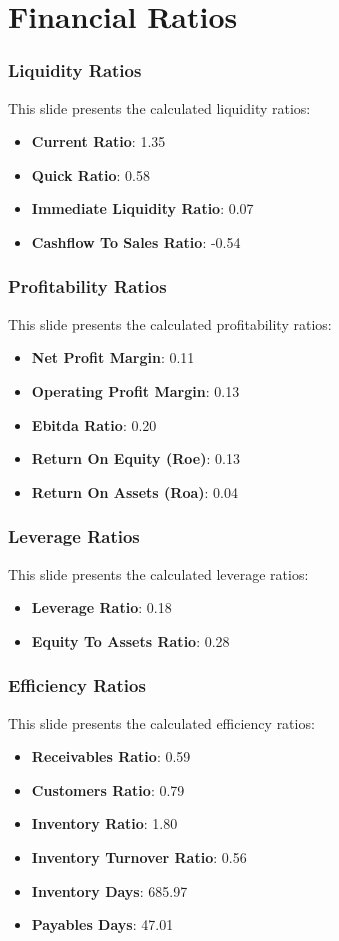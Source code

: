 \documentclass{beamer}%
\begin{document}
\section{Financial Ratios}%
\label{sec:FinancialRatios}%
\begin{frame}%
\frametitle{Liquidity Ratios}%
This slide presents the calculated liquidity ratios:%
\begin{itemize}%
\item \textbf{Current Ratio}: 1.35%
\item \textbf{Quick Ratio}: 0.58%
\item \textbf{Immediate Liquidity Ratio}: 0.07%
\item \textbf{Cashflow To Sales Ratio}: -0.54%
\end{itemize}%
\end{frame}%
\begin{frame}%
\frametitle{Profitability Ratios}%
This slide presents the calculated profitability ratios:%
\begin{itemize}%
\item \textbf{Net Profit Margin}: 0.11%
\item \textbf{Operating Profit Margin}: 0.13%
\item \textbf{Ebitda Ratio}: 0.20%
\item \textbf{Return On Equity (Roe)}: 0.13%
\item \textbf{Return On Assets (Roa)}: 0.04%
\end{itemize}%
\end{frame}%
\begin{frame}%
\frametitle{Leverage Ratios}%
This slide presents the calculated leverage ratios:%
\begin{itemize}%
\item \textbf{Leverage Ratio}: 0.18%
\item \textbf{Equity To Assets Ratio}: 0.28%
\end{itemize}%
\end{frame}%
\begin{frame}%
\frametitle{Efficiency Ratios}%
This slide presents the calculated efficiency ratios:%
\begin{itemize}%
\item \textbf{Receivables Ratio}: 0.59%
\item \textbf{Customers Ratio}: 0.79%
\item \textbf{Inventory Ratio}: 1.80%
\item \textbf{Inventory Turnover Ratio}: 0.56%
\item \textbf{Inventory Days}: 685.97%
\item \textbf{Payables Days}: 47.01%
\end{itemize}%
\end{frame}
\end{document}
